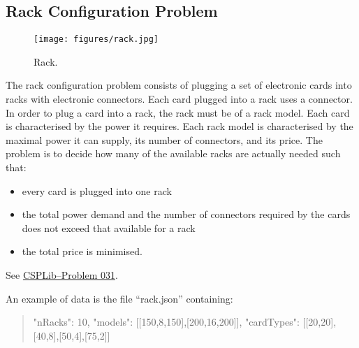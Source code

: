 \documentclass[10pt]{article}
\newcommand{\nn}[1]{{\tt #1}} %
\newenvironment{myvb}{\endgraf\small\verbatim}{\endverbatim}
\def\bef{\rule{10cm}{0.1mm}} %
\def\aft{\rule{10cm}{0.1mm}\medskip}
\begin{document}


\subsection{Rack Configuration Problem}

\begin{figure}[h]
\begin{center}
  \texttt{[image: figures/rack.jpg]}
\end{center}
\caption{Rack.\label{fig:rack}}
\end{figure}

The rack configuration problem consists of plugging a set of electronic cards into racks with electronic connectors.
Each card plugged into a rack uses a connector.
In order to plug a card into a rack, the rack must be of a rack model.
Each card is characterised by the power it requires.
Each rack model is characterised by the maximal power it can supply, its number of connectors, and its price.
The problem is to decide how many of the available racks are actually needed such that: %
\begin{itemize}
\item every card is plugged into one rack
\item the total power demand and the number of connectors required by the cards does not exceed that available for a rack
\item the total price is minimised.
\end{itemize}
See \href{http://csplib.org/Problems/prob031/}{CSPLib--Problem 031}.


An example of data is the file ``rack.json'' containing:

{\small
\begin{quote}
\begin{myvb}
{
  "nRacks": 10,
  "models": [[150,8,150],[200,16,200]],
  "cardTypes": [[20,20],[40,8],[50,4],[75,2]]
}
\end{myvb}
\end{quote}
}
\end{document}
